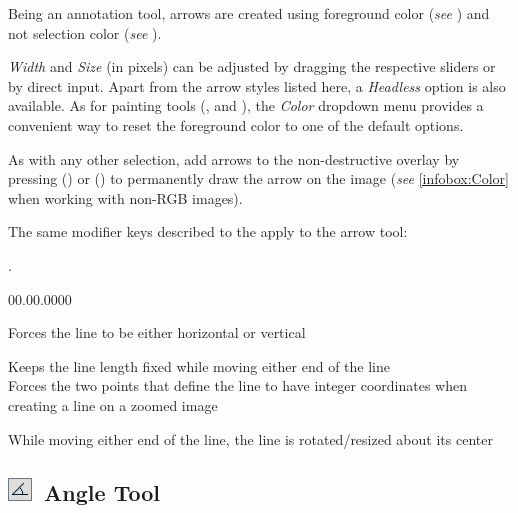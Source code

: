 \begin{minipage}[c][1\totalheight][t]{0.652\columnwidth}%
Being an annotation tool, arrows are created using
foreground color (\emph{see} \textsf{})
and not selection color (\emph{see} ).

\medskip{}


\emph{Width} and \emph{Size} (in pixels) can be adjusted by dragging
the respective sliders or by direct input. Apart from the arrow styles
listed here, a \emph{Headless} option is also available. As for painting
tools (,  and ),
the \emph{Color} dropdown menu provides a convenient way to reset
the foreground color to one of the default options.\medskip{}


\noindent As with any other selection, add arrows to the non-destructive
overlay by pressing  (\textsf{})
or  (\textsf{})
to permanently draw the arrow on the image (\emph{see} \ref{infobox:Color}
 when working with non-RGB images).\medskip{}


\noindent The same modifier keys described to the 
apply to the arrow tool:%
\end{minipage}.
\begin{lyxlist}{00.00.0000}
\item [{\mykeystroke{Shift}}] \noindent Forces the line to be either horizontal
or vertical
\item [{\mykeystroke{Alt}}] \noindent Keeps the line length fixed while
moving either end of the line\\
Forces the two points that define the line to have integer coordinates
when creating a line on a zoomed image
\item [{\mykeystroke{Ctrl}}] \noindent While moving either end of the
line, the line is rotated/resized about its center
\end{lyxlist}



\subsection[Angle Tool]{\noindent \textsf{\protect\includegraphics[bb=0bp 5bp 20bp 20bp,scale=0.6]{images/tools/Angle}}~Angle
Tool\label{sec:Angle-Tool}}


